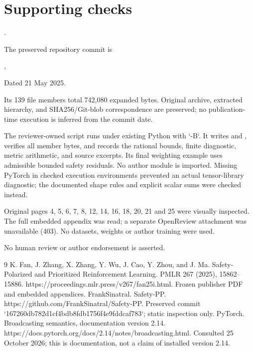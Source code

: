 \documentclass[10pt]{article}
\begin{document}
\section*{Supporting checks}
.\par
The preserved repository commit is\par
,\par
Dated 21 May 2025.\par
Its 139 file members total 742,080 expanded bytes. Original archive, extracted hierarchy, and SHA256/Git-blob correspondence are preserved; no publication-time execution is inferred from the commit date.\par
The reviewer-owned script runs under existing Python with `-B`. It writes and , verifies all member bytes, and records the rational bounds, finite diagnostic, metric arithmetic, and source excerpts. Its final weighting example uses admissible bounded safety residuals. No author module is imported. Missing PyTorch in checked execution environments prevented an actual tensor-library diagnostic; the documented shape rules and explicit scalar sums were checked instead.\par
Original pages 4, 5, 6, 7, 8, 12, 14, 16, 18, 20, 21 and 25 were visually inspected. The full embedded appendix was read; a separate OpenReview attachment was unavailable (403). No datasets, weights or author training were used.\par
No human review or author endorsement is asserted.\par
9 K. Fan, J. Zhang, X. Zhang, Y. Wu, J. Cao, Y. Zhou, and J. Ma. Safety-Polarized and Prioritized Reinforcement Learning. PMLR 267 (2025), 15862–15886. https://proceedings.mlr.press/v267/fan25i.html. Frozen publisher PDF and embedded appendices. FrankSinatral. Safety-PP. https://github.com/FrankSinatral/Safety-PP. Preserved commit `167260db782d1cf4bdb8fdb1756f4e9fddcaf783`; static inspection only. PyTorch. Broadcasting semantics, documentation version 2.14. https://docs.pytorch.org/docs/2.14/notes/broadcasting.html. Consulted 25 October 2026; this is documentation, not a claim of installed version 2.14.\par
\end{document}
